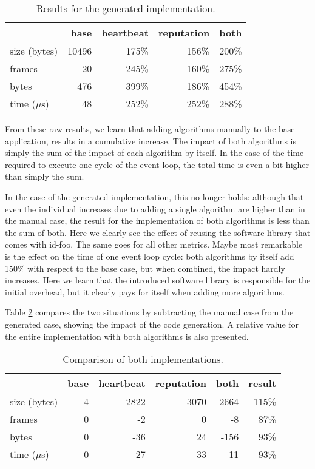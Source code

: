 \documentclass[conference]{IEEEtran}
\newcommand{\NAME}{id-foo\xspace}
\begin{document}
\begin{table}[H]
  \centering
  \begin{tabular}{lrrrr}
  \hline
         & base & heartbeat & reputation & both\\
  \hline
  size (bytes) & 10496 & 175\% & 156\% & 200\%\\
  frames & 20 & 245\% & 160\% & 275\%\\
  bytes & 476 & 399\% & 186\% & 454\%\\
  time ($\mu$s) & 48 & 252\% & 252\% & 288\%\\
  \hline
  \end{tabular}
  \caption{Results for the generated implementation.}
  \label{tbl:generated}
\end{table}

From these raw results, we learn that adding algorithms manually to the
base-application, results in a cumulative increase. The impact of both
algorithms is simply the sum of the impact of each algorithm by itself. In the
case of the time required to execute one cycle of the event loop, the total
time is even a bit higher than simply the sum.

In the case of the generated implementation, this no longer holds: although
that even the individual increases due to adding a single algorithm are higher
than in the manual case, the result for the implementation of both algorithms
is less than the sum of both. Here we clearly see the effect of reusing the
software library that comes with \NAME. The same goes for all other metrics.
Maybe most remarkable is the effect on the time of one event loop cycle: both
algorithms by itself add 150\% with respect to the base case, but when
combined, the impact hardly increases. Here we learn that the introduced
software library is responsible for the initial overhead, but it clearly pays
for itself when adding more algorithms.

Table \ref{tbl:summary} compares the two situations by subtracting the manual
case from the generated case, showing the impact of the code generation. A
relative value for the entire implementation with both algorithms is also
presented.

\begin{table}[H]
  \centering
  \begin{tabular}{lrrrrr}
  \hline
                & base & heartbeat & reputation & both  & result \\
  \hline
  size (bytes)  & -4    & 2822     & 3070       & 2664  & 115\%  \\
  frames        & 0     & -2       & 0          & -8    & 87\%   \\
  bytes         & 0     & -36      & 24         & -156  & 93\%   \\
  time ($\mu$s) & 0     & 27       & 33         & -11   & 93\%   \\
  \hline
  \end{tabular}
  \caption{Comparison of both implementations.}
  \label{tbl:summary}
\end{table}
\end{document}
